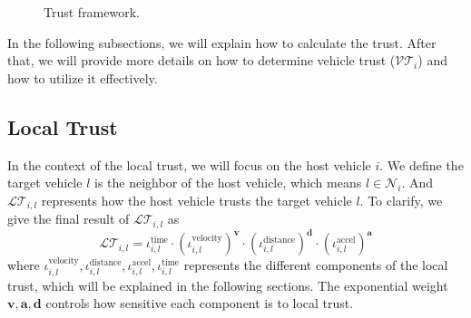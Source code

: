 \documentclass[letterpaper, 10pt, conference]{ieeeconf}  %
\def\N{\mathcal{N}} %
\def\LT{\mathcal{LT}} %
\def\VT{\mathcal{VT}} %
\begin{document}
\begin{figure}[h!]
    \caption{Trust framework.}
    \label{fig_trust_framework}
\end{figure}


In the following subsections, we will explain how to calculate the trust. After that, we will provide more details on how to determine vehicle trust ($\VT_{i}$) and how to utilize it effectively.

\subsection{Local Trust}
\label{sub:local_trust}

In the context of the local trust, we will focus on the host vehicle $i$. We define the target vehicle $l$ is the neighbor of the host vehicle, which means $l \in {\N}_{i}$. And $\LT_{i,l}$ represents how the host vehicle trusts the target vehicle $l$. 
To clarify, we give the final result of $\LT_{i,l}$ as
\begin{equation}
    \LT_{i,l}= \iota_{i,l}^\text{time} \cdot (\iota_{i,l}^\text{velocity})^\mathbf{v} \cdot (\iota_{i,l}^\text{distance})^\mathbf{d} \cdot (\iota_{i,l}^{\text{accel}})^\mathbf{a}
\end{equation}
where $\iota_{i,l}^\text{velocity}, \iota_{i,l}^\text{distance}, \iota_{i,l}^\text{accel}, \iota_{i,l}^\text{time}$ represents the different components of the local trust, which will be explained in the following sections. The exponential weight $\mathbf{v},\mathbf{a},\mathbf{d}$ controls how sensitive each component is to local trust. 
\end{document}
